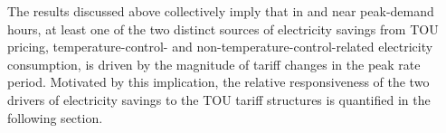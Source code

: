 The results discussed above collectively imply that in and near peak-demand hours, at least one of the two distinct sources of electricity savings from TOU pricing, temperature-control- and non-temperature-control-related electricity consumption, is driven by the magnitude of tariff changes in the peak rate period. Motivated by this implication, the relative responsiveness of the two drivers of electricity savings to the TOU tariff structures is quantified in the following section. 

%
